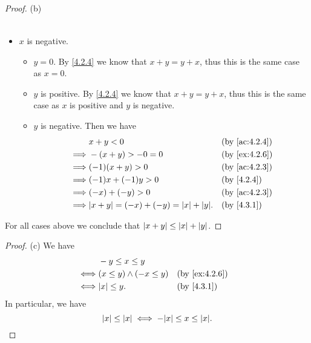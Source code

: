 \begin{proof}{(b)}
\begin{itemize}
\begin{itemize}
\begin{itemize}
\begin{align*}
                          \end{align*}
                  \end{itemize}
          \end{itemize}
    \item \(x\) is negative.
          \begin{itemize}
            \item \(y = 0\).
                  By \cref{4.2.4} we know that \(x + y = y + x\), thus this is the same case as \(x = 0\).
            \item \(y\) is positive.
                  By \cref{4.2.4} we know that \(x + y = y + x\), thus this is the same case as \(x\) is positive and \(y\) is negative.
            \item \(y\) is negative.
                  Then we have
                  \begin{align*}
                             & x + y < 0                                      &  & \by{ac:4.2.4} \\
                    \implies & -(x + y) > -0 = 0                              &  & \by{ex:4.2.6} \\
                    \implies & (-1)(x + y) > 0                                &  & \by{ac:4.2.3} \\
                    \implies & (-1)x + (-1)y > 0                              &  & \by{4.2.4}    \\
                    \implies & (-x) + (-y) > 0                                &  & \by{ac:4.2.3} \\
                    \implies & \abs{x + y} = (-x) + (-y) = \abs{x} + \abs{y}. &  & \by{4.3.1}
                  \end{align*}
          \end{itemize}
  \end{itemize}
  For all cases above we conclude that \(\left\lvert x + y\right\rvert \leq \left\lvert x\right\rvert + \left\lvert y\right\rvert\).
\end{proof}

\begin{proof}{(c)}
  We have
  \begin{align*}
         & -y \leq x \leq y                                \\
    \iff & (x \leq y) \land (-x \leq y) &  & \by{ex:4.2.6} \\
    \iff & \abs{x} \leq y.              &  & \by{4.3.1}
  \end{align*}
  In particular, we have
  \[
    \abs{x} \leq \abs{x} \iff -\abs{x} \leq x \leq \abs{x}.
  \]
\end{proof}

